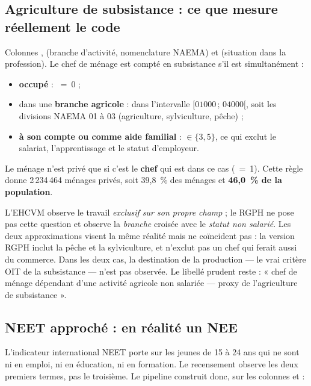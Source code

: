 \documentclass[11pt,a4paper]{article}
\begin{document}
\subsection{Agriculture de subsistance : ce que mesure réellement le code}

Colonnes ,  (branche d'activité, nomenclature NAEMA) et
 (situation dans la profession). Le chef de ménage est compté en
subsistance s'il
est simultanément :

\begin{itemize}
  \item \textbf{occupé} : ~=~0 ;
  \item dans une \textbf{branche agricole} :  dans l'intervalle
  $[01000\,;\,04000[$, soit les divisions NAEMA 01 à 03 (agriculture, sylviculture, pêche) ;
  \item \textbf{à son compte ou comme aide familial} :  $\in \{3, 5\}$, ce qui
  exclut le salariat, l'apprentissage et le statut d'employeur.
\end{itemize}

Le ménage n'est privé que si c'est le \textbf{chef} qui est dans ce cas (~=~1). Cette
règle donne 2\,234\,464 ménages privés, soit 39,8~\% des ménages et \textbf{46,0~\% de la
population}.

\begin{attention}
L'EHCVM observe le travail \emph{exclusif sur son propre champ} ; le RGPH ne pose pas cette
question et observe la \emph{branche} croisée avec le \emph{statut non salarié}. Les deux
approximations visent la même réalité mais ne coïncident pas : la version RGPH inclut la pêche
et la sylviculture, et n'exclut pas un chef qui ferait aussi du commerce. Dans les deux cas, la
destination de la production --- le vrai critère OIT de la subsistance --- n'est pas observée.
Le libellé prudent reste : « chef de ménage dépendant d'une activité agricole non salariée ---
proxy de l'agriculture de subsistance ».
\end{attention}

\subsection{NEET approché : en réalité un NEE}

L'indicateur international NEET porte sur les jeunes de 15 à 24 ans qui ne sont ni en emploi, ni
en éducation, ni en formation. Le recensement observe les deux premiers termes, pas le
troisième. Le pipeline construit donc, sur les colonnes  et  :
\end{document}

